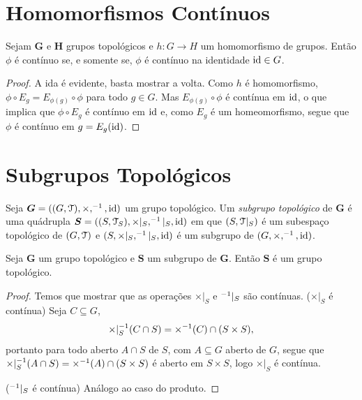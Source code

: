 \section{Homomorfismos Contínuos}

\begin{prop}
Sejam $\bm G$ e $\bm H$ grupos topológicos e $h: G \to H$ um homomorfismo de grupos. Então $\phi$ é contínuo se, e somente se, $\phi$ é contínuo na identidade $\mathrm{id} \in G$.
\end{prop}
\begin{proof}
A ida é evidente, basta mostrar a volta. Como $h$ é homomorfismo, $\phi \circ E_g = E_{\phi(g)} \circ \phi$ para todo $g \in G$. Mas $E_{\phi(g)} \circ \phi$ é contínua em $\mathrm{id}$, o que implica que $\phi \circ E_g$ é contínuo em $\mathrm{id}$ e, como $E_g$ é um homeomorfismo, segue que $\phi$ é contínuo em $g=E_g(\mathrm{id})$.
\end{proof}

\section{Subgrupos Topológicos}

\begin{defi}
Seja $\bm G = ((G,\mathcal{T}),\times,^{-1},\mathrm{id})$ um grupo topológico. Um \emph{subgrupo topológico} de $\bm G$ é uma quádrupla $\bm S = ((S,\mathcal{T}_S),\times|_S,^{-1}|_S,\mathrm{id})$ em que $(S,\mathcal{T}|_S)$ é um subespaço topológico de $(G,\mathcal{T})$ e $(S,\times|_S,^{-1}|_S,\mathrm{id})$ é um subgrupo de $(G,\times,^{-1},\mathrm{id})$.
\end{defi}

\begin{prop}
Seja $\bm G$ um grupo topológico e $\bm S$ um subgrupo de $\bm G$. Então $\bm S$ é um grupo topológico.
\end{prop}
\begin{proof}
Temos que mostrar que as operações $\times|_S$ e $^{-1}|_S$ são contínuas. ($\times|_S$ é contínua) Seja $C \subseteq G$,
	\begin{equation*}
	\times|_S ^{-1} (C \cap S) = \times ^{-1} (C) \cap (S \times S),
	\end{equation*}
portanto para todo aberto $A \cap S$ de $S$, com $A \subseteq G$ aberto de $G$, segue que $\times|_S ^{-1} (A \cap S) = \times ^{-1} (A) \cap (S \times S)$ é aberto em $S \times S$, logo $\times|_S$ é contínua.

($^{-1}|_S$ é contínua) Análogo ao caso do produto.
\end{proof}

